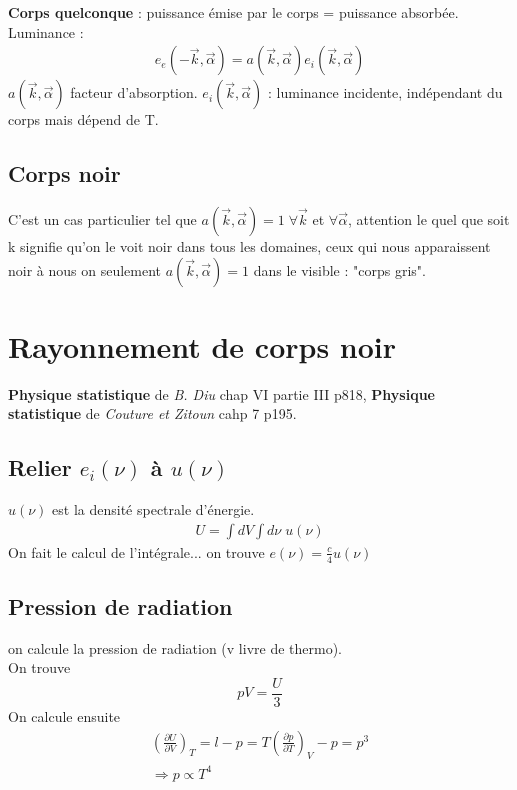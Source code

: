 \documentclass[12pt,prb,aps,epsf]{article}
\begin{document}
\textbf{Corps quelconque} : puissance émise par le corps = puissance absorbée.\\
Luminance :
\begin{eqnarray}
e_e(-\vec{k},\vec{\alpha}) = a(\vec{k},\vec{\alpha})e_i(\vec{k},\vec{\alpha})
\end{eqnarray}
$a(\vec{k},\vec{\alpha})$ facteur d'absorption.
$e_i(\vec{k},\vec{\alpha})$ : luminance incidente, indépendant du corps mais dépend de T.

\subsection{Corps noir}
C'est un cas particulier tel que $a(\vec{k},\vec{\alpha}) = 1\; \forall \vec{k}$ et $\forall \vec{\alpha}$, attention le quel que soit k signifie qu'on le voit noir dans tous les domaines, ceux qui nous apparaissent noir à nous on seulement $a(\vec{k},\vec{\alpha}) = 1$ dans le visible : "corps gris".

\section{Rayonnement de corps noir}
\textbf{Physique statistique} de \textit{B. Diu} chap VI partie III p818, \textbf{Physique statistique} de \textit{Couture et Zitoun} cahp 7 p195.
\subsection{Relier $e_i(\nu)$ à $u(\nu)$}
$u(\nu)$ est la densité spectrale d'énergie.
\begin{eqnarray}
U = \int dV \int d\nu\; u(\nu)
\end{eqnarray}
On fait le calcul de l'intégrale... on trouve $e(\nu) = \frac{c}{4}u(\nu)$

\subsection{Pression de radiation}
on calcule la pression de radiation (v livre de thermo).\\
On trouve 
\begin{equation}
pV = \frac{U}{3}
\end{equation}
On calcule ensuite 
\begin{eqnarray}
\left(\frac{\partial U}{\partial V}\right)_T = l-p = T\left(\frac{\partial p}{\partial T}\right)_V - p = p^3\\
\Rightarrow p \propto T^4
\end{eqnarray}
\end{document}

